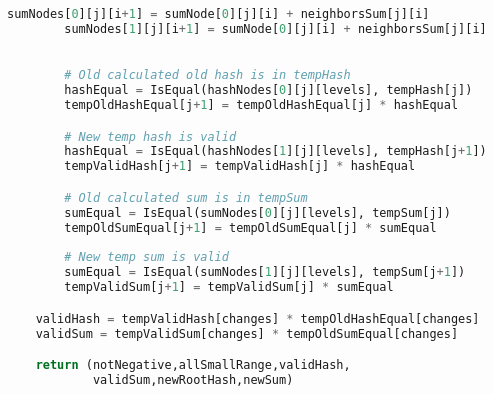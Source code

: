 \begin{lstlisting}[language=Python, caption=Liabilities change circuit pseudocode]
        sumNodes[0][j][i+1] = sumNode[0][j][i] + neighborsSum[j][i]
        sumNodes[1][j][i+1] = sumNode[0][j][i] + neighborsSum[j][i]
            

        # Old calculated old hash is in tempHash
        hashEqual = IsEqual(hashNodes[0][j][levels], tempHash[j])
        tempOldHashEqual[j+1] = tempOldHashEqual[j] * hashEqual

        # New temp hash is valid
        hashEqual = IsEqual(hashNodes[1][j][levels], tempHash[j+1])
        tempValidHash[j+1] = tempValidHash[j] * hashEqual

        # Old calculated sum is in tempSum
        sumEqual = IsEqual(sumNodes[0][j][levels], tempSum[j])
        tempOldSumEqual[j+1] = tempOldSumEqual[j] * sumEqual
        
        # New temp sum is valid
        sumEqual = IsEqual(sumNodes[1][j][levels], tempSum[j+1])
        tempValidSum[j+1] = tempValidSum[j] * sumEqual

    validHash = tempValidHash[changes] * tempOldHashEqual[changes]
    validSum = tempValidSum[changes] * tempOldSumEqual[changes]

    return (notNegative,allSmallRange,validHash, 
            validSum,newRootHash,newSum)
    
\end{lstlisting}
